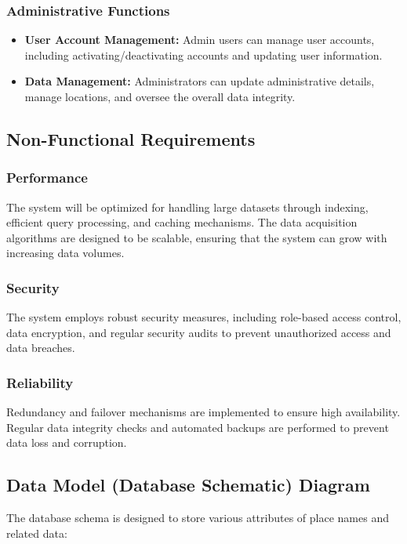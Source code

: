 \subsubsection{Administrative Functions}
\begin{itemize}
    \item \textbf{User Account Management:} Admin users can manage user accounts, including activating/deactivating accounts and updating user information.
    \item \textbf{Data Management:} Administrators can update administrative details, manage locations, and oversee the overall data integrity.
\end{itemize}

\subsection{Non-Functional Requirements}

\subsubsection{Performance}
The system will be optimized for handling large datasets through indexing, efficient query processing, and caching mechanisms. The data acquisition algorithms are designed to be scalable, ensuring that the system can grow with increasing data volumes.

\subsubsection{Security}
The system employs robust security measures, including role-based access control, data encryption, and regular security audits to prevent unauthorized access and data breaches.

\subsubsection{Reliability}
Redundancy and failover mechanisms are implemented to ensure high availability. Regular data integrity checks and automated backups are performed to prevent data loss and corruption.

\subsection{Data Model (Database Schematic) Diagram}
The database schema is designed to store various attributes of place names and related data:


